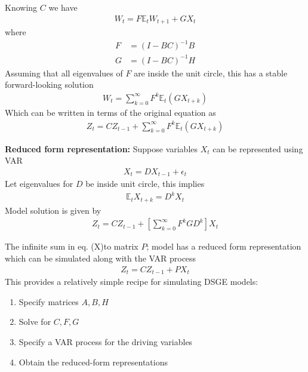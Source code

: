 \documentclass{beamer}
\begin{document}
\begin{frame}
  Knowing $C$ we have
  \begin{align}
    W_t=F\mathbb{E}_t W_{t+1} + GX_t
  \end{align}
  where
  \begin{align}
      F &= (I-BC)^{-1}B\\
      G &= (I-BC)^{-1}H  
  \end{align}
  Assuming that all eigenvalues of $F$ are inside the unit circle, this has a stable forward-looking solution
  \begin{align}
    W_t= \sum^{\infty}_{k=0} F^k\mathbb{E}_t(GX_{t+k})
  \end{align}
  Which can be written in terms of the original equation as
  \begin{align}
    Z_t= CZ_{t-1} + \sum^{\infty}_{k=0} F^k\mathbb{E}_t(GX_{t+k})
  \end{align}
\end{frame}


\begin{frame}
  \textbf{Reduced form representation:}
  Suppose variables $X_t$ can be represented using VAR
  \begin{align}
    X_t=DX_{t-1} + \epsilon_t
  \end{align}
  Let eigenvalues for $D$ be inside unit circle, this implies
  \begin{align}
    \mathbb{E}_t X_{t+k}=D^k X_t
  \end{align}
  Model solution is given by
  \begin{align}
    Z_t= CZ_{t-1} + \left[ \sum^{\infty}_{k=0}F^k GD^k \right]X_t  
  \end{align}
\end{frame}

\begin{frame}
  The infinite sum in eq. (X)to matrix $P$; model has a reduced form representation which can be simulated along with the VAR process 
\begin{align}
  Z_t= CZ_{t-1} + PX_t
\end{align}
This provides a relatively simple recipe for simulating DSGE models:
\begin{enumerate}
  \item Specify matrices $A,B,H$
  \item Solve for $C,F,G$
  \item Specify a VAR process for the driving variables
  \item Obtain the reduced-form representations  
\end{enumerate}
\end{frame}
\end{document}
